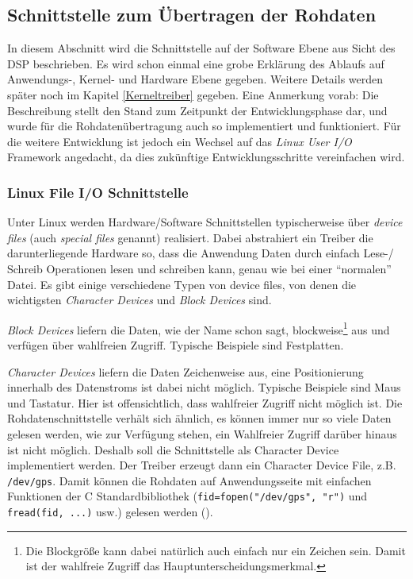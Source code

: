 
\subsection{Schnittstelle zum Übertragen der Rohdaten}
In diesem Abschnitt wird die Schnittstelle auf der Software Ebene aus Sicht des DSP beschrieben. Es wird schon einmal eine grobe Erklärung des Ablaufs auf Anwendungs-, Kernel- und Hardware Ebene gegeben. Weitere Details werden später noch im Kapitel \ref{Kerneltreiber} gegeben. Eine Anmerkung vorab: Die Beschreibung stellt den Stand zum Zeitpunkt der Entwicklungsphase dar, und wurde für die Rohdatenübertragung auch so implementiert und funktioniert. Für die weitere Entwicklung ist jedoch ein Wechsel auf das \emph{Linux User I/O} Framework angedacht, da dies zukünftige Entwicklungsschritte vereinfachen wird. 

\subsubsection{Linux File I/O Schnittstelle}
Unter Linux werden Hardware/Software Schnittstellen typischerweise über \emph{device files} (auch \emph{special files} genannt) realisiert. Dabei abstrahiert ein Treiber die darunterliegende Hardware so, dass die Anwendung Daten durch einfach Lese-/ Schreib Operationen lesen und schreiben kann, genau wie bei einer \enquote{normalen} Datei. Es gibt einige verschiedene Typen von device files, von denen die wichtigsten \emph{Character Devices} und \emph{Block Devices} sind. 

\emph{Block Devices} liefern die Daten, wie der Name schon sagt, blockweise\footnote{Die Blockgröße kann dabei natürlich auch einfach nur ein Zeichen sein. Damit ist der wahlfreie Zugriff das Hauptunterscheidungsmerkmal.} aus und verfügen über wahlfreien Zugriff. Typische Beispiele sind Festplatten.

\emph{Character Devices} liefern die Daten Zeichenweise aus, eine Positionierung innerhalb des Datenstroms ist dabei nicht möglich. Typische Beispiele sind Maus und Tastatur. Hier ist offensichtlich, dass wahlfreier Zugriff nicht möglich ist. Die Rohdatenschnittstelle verhält sich ähnlich, es können immer nur so viele Daten gelesen werden, wie zur Verfügung stehen, ein Wahlfreier Zugriff darüber hinaus ist nicht möglich. Deshalb soll die Schnittstelle als Character Device implementiert werden. Der Treiber erzeugt dann ein Character Device File, z.B. \lstinline$/dev/gps$. Damit können die Rohdaten auf Anwendungsseite mit einfachen Funktionen der C Standardbibliothek (\lstinline$fid=fopen("/dev/gps", "r")$ und \lstinline$fread(fid, ...)$ usw.) gelesen werden ().

